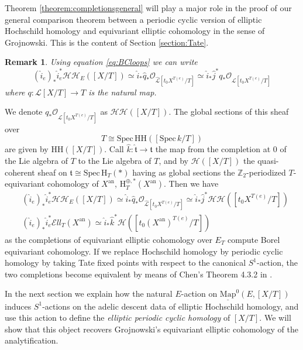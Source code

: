 \documentclass[11pt,letterpaper]{amsart}
\newtheorem{remark}[dummy]{Remark}
\newcommand{\mHH}{\mathrm{HH}}
\newcommand{\cO}{\mathcal{O}}
\newcommand{\cL}{\mathcal{L}}
\newcommand{\cHH}{\mathcal{HH}}
\newcommand{\cH}{\mathcal{H}}
\newcommand{\ft}{\mathfrak{t}}
\newcommand{\Mapo}[2]{\underline{\mathrm{Map}}^{0}\left (#1,#2\right )}
\newcommand{\Spec}{\mathrm{S}\mathrm{pec}\,}
\newcommand{\El}{\mathcal{E}ll}
\newcommand{\an}{\mathrm{an}}
\begin{document}
Theorem \ref{theorem:completionsgeneral} will play a major role in the proof of our general comparison theorem between a periodic cyclic version of elliptic Hochschild homology and equivariant elliptic cohomology in the sense of Grojnowski. This is the content of Section \ref{section:Tate}.


\begin{remark}
Using equation \eqref{eq:BCloops} we can write
\begin{equation*}
(\widehat{i}_e)_\ast\widehat{i}_e^\ast \cHH_E([X/T]) \simeq \widehat{i}_{\ast}\widehat{q}_{\ast}\cO_{\widehat{\cL}[t_0 X^{T(e)}/T]} \simeq \widehat{i}_{\ast}\widehat{j}^{\ast}q_{\ast}\cO_{\cL[t_0 X^{T(e)}/T]}
\end{equation*}
where $q: \cL [X/T] \to T$ is the natural map. 
\end{remark}
We denote $q_{\ast}\cO_{\cL[t_0 X^{T(e)}/T]}$ as $\cHH([X/T])$. The global sections of this sheaf over 
$$T\cong\Spec \mathrm{HH}([\Spec k/T])$$ are given by $\mHH([X/T])$. 
Call $\widehat{k}:\widehat{\ft}\rightarrow\ft$ the map from the completion at $0$ of the Lie algebra of $T$ to the Lie algebra of $T$, and by $\cH([X/T])$ the quasi-coherent sheaf on $\ft \cong \Spec \mathrm{H}_T(\ast)$ having as global sections  the $\mathbb{Z}_2$-periodized $T$-equivariant cohomology of $X^\an$, $\mathrm{H}_T^{\oplus,\ast}(X^\an)$. Then we have
\begin{align*}
& (\widehat{i}_e)_\ast\widehat{i}_e^\ast \cHH_E([X/T]) \simeq \widehat{i}_{\ast}\widehat{q}_{\ast}\cO_{\widehat{\cL}[t_0 X^{T(e)}/T]} \simeq \widehat{i}_{\ast}\widehat{j}^{\ast}\cHH([t_0 X^{T(e)}/T])\\
& (\widehat{i}_e)_\ast\widehat{i}_e^\ast\El_T(X^\an)\simeq\widehat{i}_{\ast}\widehat{k}^{\ast}\cH([t_0 (X^\an)^{T(e)}/T])
\end{align*}
as the completions of equivariant elliptic cohomology over $E_T$ compute Borel equivariant cohomology. If we replace Hochschild homology by periodic cyclic homology by taking Tate fixed points with respect to the canonical $S^1$-action, the two completions become equivalent by means of Chen's Theorem 4.3.2 in \cite{HChen}.

In the next section we explain how the natural $E$-action on $\Mapo{E}{[X/T]}$ induces $S^1$-actions on the adelic descent data of elliptic Hochschild homology, and use this action to  define the \emph{elliptic periodic cyclic homology} of $[X/T]$. We will show that this object recovers Grojnowski's equivariant elliptic cohomology of the analytification.
\end{document}
